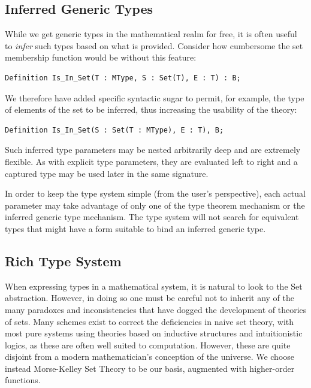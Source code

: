 	\subsection{Inferred Generic Types\label{inferredGenericTypes}}

While we get generic types in the mathematical realm for free, it is often useful to \emph{infer} such types based on what is provided.  Consider how cumbersome the set membership function would be without this feature:

\begin{lstlisting}
Definition Is_In_Set(T : MType, S : Set(T), E : T) : B;
\end{lstlisting}

We therefore have added specific syntactic sugar to permit, for example, the type of elements of the set to be inferred, thus increasing the usability of the theory:

\begin{lstlisting}
Definition Is_In_Set(S : Set(T : MType), E : T), B;
\end{lstlisting}

Such inferred type parameters may be nested arbitrarily deep and are extremely flexible.  As with explicit type parameters, they are evaluated left to right and a captured type may be used later in the same signature.

In order to keep the type system simple (from the user's perspective), each actual parameter may take advantage of only one of the type theorem mechanism or the inferred generic type mechanism.  The type system will not search for equivalent types that might have a form suitable to bind an inferred generic type.

	\subsection{Rich Type System\label{richTypeSystem}}

When expressing types in a mathematical system, it is natural to look to the Set abstraction.  However, in doing so one must be careful not to inherit any of the many paradoxes and inconsistencies that have dogged the development of theories of sets.  Many schemes exist to correct the deficiencies in naive set theory, with most pure systems using theories based on inductive structures and intuitionistic logics, as these are often well suited to computation.  However, these are quite disjoint from a modern mathematician's conception of the universe.  We choose instead Morse-Kelley Set Theory to be our basis, augmented with higher-order functions.

